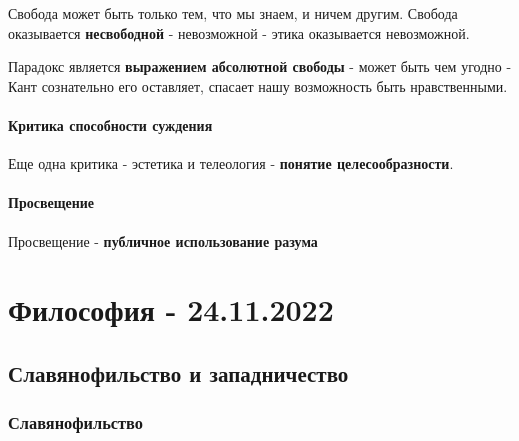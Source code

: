 \documentclass{article}
\begin{document}
\begin{flushleft}
Свобода может быть только тем, что мы знаем, и ничем другим. Свобода оказывается \textbf{несвободной} - невозможной - этика оказывается невозможной.

Парадокс является \textbf{выражением абсолютной свободы} - может быть чем угодно - Кант сознательно его оставляет, спасает нашу возможность быть нравственными.

\paragraph{Критика способности суждения} Еще одна критика - эстетика и телеология - \textbf{понятие целесообразности}.

\paragraph{Просвещение} Просвещение - \textbf{публичное использование разума}

\end{flushleft}

\pagebreak
\section{Философия - 24.11.2022}

\subsection{Славянофильство и западничество}

\subsubsection{Славянофильство}
\end{document}
